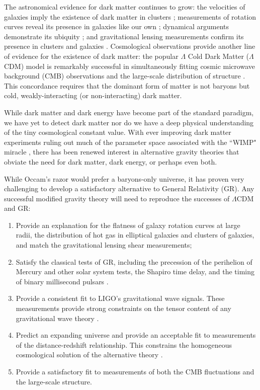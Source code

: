 \documentclass[12pt,floats,floatfix,showpacs,amssymb,amsmath,prl,superscriptaddress,nofootinbib, aps]{revtex4-2}
\begin{document}
The astronomical evidence for dark matter continues to grow: the velocities of galaxies imply the existence of dark matter in clusters \citep{Zwicky1933,Einasto1974}; measurements of rotation curves reveal its presence in galaxies like our own \citep{Rubin1978,BosmaPhD,Rubin1980}; dynamical arguments demonstrate its ubiquity \citep{Ostriker1974}; and gravitational lensing measurements confirm its presence in clusters and galaxies \citep{Tyson1990,Wittman2000}. Cosmological observations provide another line of evidence for the existence of dark matter: the popular $\Lambda$ Cold Dark Matter ($\Lambda$CDM) model is remarkably successful in simultaneously fitting cosmic microwave background (CMB) observations and the large-scale distribution of structure \citep[e.g.,][]{Spergel2003, Planck2018}. This concordance requires that the dominant form of matter is not baryons but cold, weakly-interacting (or non-interacting) dark matter.

While dark matter and dark energy have become part of the standard paradigm, we have yet to detect dark matter nor do we have a deep physical understanding of the tiny cosmological constant value. With ever improving dark matter experiments ruling out much of the parameter space associated with the ``WIMP" miracle \citep{Aprile2018,aprile2019}, there has been renewed interest in alternative gravity theories that obviate the need for dark matter, dark energy, or perhaps even both.

While Occam's razor would prefer a baryons-only universe, it has proven very challenging to develop a satisfactory alternative to General Relativity (GR). Any successful modified gravity theory will need to reproduce the successes of $\Lambda$CDM and GR:
\begin{enumerate}
\item Provide an explanation for the flatness of galaxy rotation curves at large radii, the distribution of hot gas in elliptical galaxies and clusters of galaxies, and match the gravitational lensing shear measurements;
\item Satisfy the classical tests of GR, including the precession of the perihelion of Mercury and other solar system tests, the Shapiro time delay, and the timing of binary millisecond pulsars \citep{Will1993}.
\item Provide a consistent fit to LIGO's gravitational wave signals. These measurements provide strong constraints on the tensor content of any gravitational wave theory \citep{LIGOGRTests2019,Abbott2017,Pardo2018, Lagos2019}.
\item Predict an expanding universe and provide an acceptable fit to measurements of the distance-redshift relationship. This constrains the homogeneous cosmological solution of the alternative theory \citep[c.f.,][]{Ishak2019}.
\item Provide a satisfactory fit to measurements of both the CMB fluctuations and the large-scale structure. 
\end{enumerate}
\end{document}
